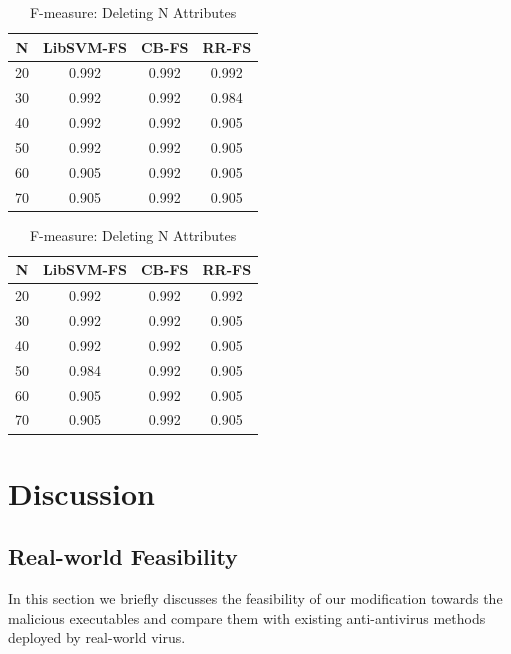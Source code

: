 \documentclass[11pt]{article}
\begin{document}
\begin{table}[!htb]

\centering
\begin{minipage}{0.46\columnwidth}
\begin{tabular}{c  c  c c} \hline

N & LibSVM-FS & CB-FS & RR-FS \\\hline
20 & 0.992 & 0.992 & 0.992 \\
30 & 0.992 & 0.992 & 0.984 \\
40 & 0.992 & 0.992 & 0.905 \\
50 & 0.992 & 0.992 & 0.905 \\
60 & 0.905 & 0.992 & 0.905 \\
70 & 0.905 & 0.992 & 0.905 \\
\end{tabular}
\caption{F-measure: Adding N Attributes} %
\label{tbl:add}
\end{minipage}
\hfill
\begin{minipage}{0.46\columnwidth}
\begin{tabular}{c  c  c c} \hline

N & LibSVM-FS & CB-FS & RR-FS \\\hline
20 & 0.992 & 0.992 & 0.992 \\
30 & 0.992 & 0.992 & 0.905 \\
40 & 0.992 & 0.992 & 0.905 \\
50 & 0.984 & 0.992 & 0.905 \\
60 & 0.905 & 0.992 & 0.905 \\
70 & 0.905 & 0.992 & 0.905 \\
\end{tabular}
\caption{F-measure: Deleting N Attributes} %
\label{tbl:delete}
\end{minipage}
\end{table}

\section{Discussion}

\subsection{Real-world Feasibility}
In this section we briefly discusses the feasibility of our modification towards the malicious executables and compare them with existing anti-antivirus methods deployed by real-world virus.
\end{document}
